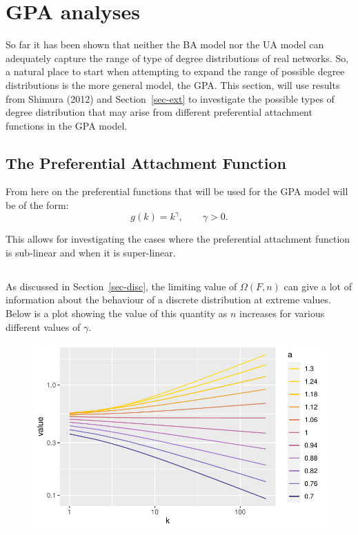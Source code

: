 \documentclass[
  10pt,
  a4paper,
]{scrreprt}
\theoremstyle{plain}
\theoremstyle{plain}
\theoremstyle{definition}
\theoremstyle{plain}
\theoremstyle{remark}
\begin{document}
{\hypertarget{gpa-analyses}{%
\section{GPA analyses}\label{gpa-analyses}}

So far it has been shown that neither the BA model nor the UA model can
adequately capture the range of type of degree distributions of real
networks. So, a natural place to start when attempting to expand the
range of possible degree distributions is the more general model, the
GPA. This section, will use results from Shimura (2012) and
Section~\ref{sec-ext} to investigate the possible types of degree
distribution that may arise from different preferential attachment
functions in the GPA model.

\hypertarget{the-preferential-attachment-function}{%
\subsection{The Preferential Attachment
Function}\label{the-preferential-attachment-function}}

From here on the preferential functions that will be used for the GPA
model will be of the form: \[
g(k) = k^\gamma, \qquad \gamma>0.
\]

This allows for investigating the cases where the preferential
attachment function is sub-linear and when it is super-linear.

\hypertarget{section}{%
\subsection{}\label{section}}

As discussed in Section~\ref{sec-disc}, the limiting value of
\(\Omega(F,n)\) can give a lot of information about the behaviour of a
discrete distribution at extreme values. Below is a plot showing the
value of this quantity as \(n\) increases for various different values
of \(\gamma\).

\begin{figure}[H]

{\centering \includegraphics{doc_files/figure-pdf/fig-omega-1.pdf}

}
\end{figure}}
\end{document}
